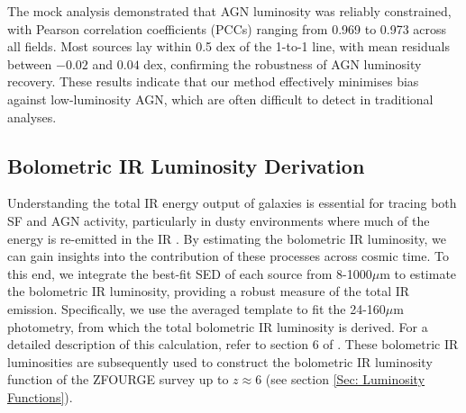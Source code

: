 The mock analysis demonstrated that AGN luminosity was reliably constrained, with Pearson correlation coefficients (PCCs) ranging from 0.969 to 0.973 across all fields. Most sources lay within 0.5 dex of the 1-to-1 line, with mean residuals between $-0.02$ and $0.04$ dex, confirming the robustness of AGN luminosity recovery. These results indicate that our method effectively minimises bias against low-luminosity AGN, which are often difficult to detect in traditional analyses.

\subsection{Bolometric IR Luminosity Derivation}
\label{sec: Bolometric IR Luminosity}

Understanding the total IR energy output of galaxies is essential for tracing both SF and AGN activity, particularly in dusty environments where much of the energy is re-emitted in the IR \citep{fu_decomposing_2010}. By estimating the bolometric IR luminosity, we can gain insights into the contribution of these processes across cosmic time. To this end, we integrate the best-fit SED of each source from 8-1000$\mu$m to estimate the bolometric IR luminosity, providing a robust measure of the total IR emission. Specifically, we use the averaged \cite{wuyts_fireworks_2008} template to fit the 24-160$\mu$m photometry, from which the total bolometric IR luminosity is derived. For a detailed description of this calculation, refer to section 6 of \cite{straatman_fourstar_2016}. These bolometric IR luminosities are subsequently used to construct the bolometric IR luminosity function of the ZFOURGE survey up to $z \approx 6$ (see section \ref{Sec: Luminosity Functions}).

